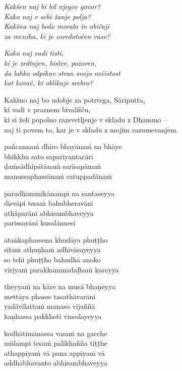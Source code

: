 \emph{Kakšen naj bi bil njegov govor?}\\
\emph{Kako naj v sebi žanje polja?}\\
\emph{Kakšna naj bodo morala in običaji}\\
\emph{za meniha, ki je osredotočen vase?}

\emph{Kako naj vadi tisti,}\\
\emph{ki je zedinjen, bister, pozoren,}\\
\emph{da lahko odpihne stran svojo nečistost}\\
\emph{kot kovač, ki oblikuje srebro?}

Kakšno naj bo udobje za potrtega, Sāriputta,\\
ki vadi v praznem bivališču,\\
ki si želi popolno razsvetljenje v skladu z Dhammo --\\
naj ti povem to, kar je v skladu z mojim razumevanjem.


\clearpage

pañcannaṁ dhīro bhayānaṁ na bhāye\\
bhikkhu sato sapariyantacārī\\
ḍaṁsādhipātānaṁ sarīsapānaṁ\\
manussaphassānaṁ catuppadānaṁ

paradhammikānampi na santaseyya\\
disvāpi tesaṁ bahubheravāni\\
athāparāni abhisambhaveyya\\
parissayāni kusalānuesī

ātaṅkaphassena khudāya phuṭṭho\\
sītaṁ athuṇhaṁ adhivāsayeyya\\
so tehi phuṭṭho bahudhā anoko\\
vīriyaṁ parakkammadaḷhaṁ kareyya

theyyaṁ na kāre na musā bhaṇeyya\\
mettāya phasse tasathāvarāni\\
yadāvilattaṁ manaso vijaññā\\
kaṇhassa pakkhoti vinodayeyya

kodhātimānassa vasaṁ na gacche\\
mūlampi tesaṁ palikhañña tiṭṭhe\\
athappiyaṁ vā pana appiyaṁ vā\\
addhābhavanto abhisambhaveyya

